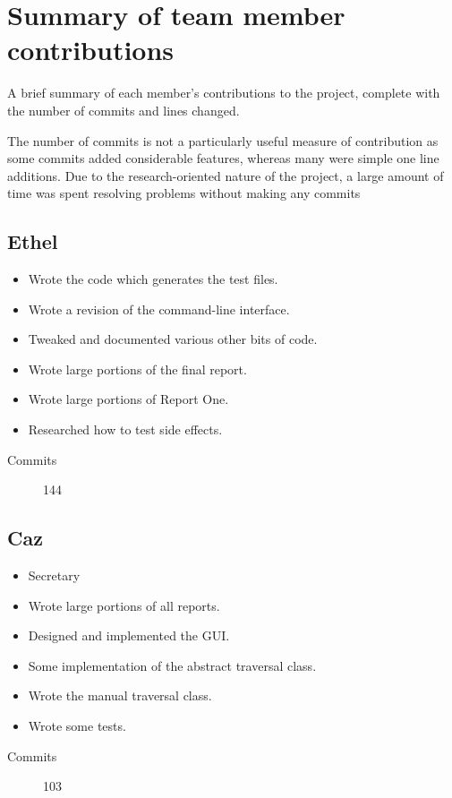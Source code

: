 \section{Summary of team member contributions}
  A brief summary of each member's contributions to the project, complete with the number of commits and lines changed.

  The number of commits is not a particularly useful measure of contribution as some commits added considerable features, whereas many were simple one line additions. 
  Due to the research-oriented nature of the project, a large amount of time was spent resolving problems without making any commits

  \subsection{Ethel}
    \begin{itemize}
      \item Wrote the code which generates the test files.
      \item Wrote a revision of the command-line interface.
      \item Tweaked and documented various other bits of code.
      \item Wrote large portions of the final report.
      \item Wrote large portions of Report One.
      \item Researched how to test side effects.
    \end{itemize}
   
    \begin{description}
      \item[Commits] 144
    \end{description}

  \subsection{Caz}
    \begin{itemize}
    \item Secretary
    \item Wrote large portions of all reports.
    \item Designed and implemented the GUI.
    \item Some implementation of the abstract traversal class.
    \item Wrote the manual traversal class.
    \item Wrote some tests.
    \end{itemize}
    \begin{description}
      \item[Commits] 103
    \end{description}

